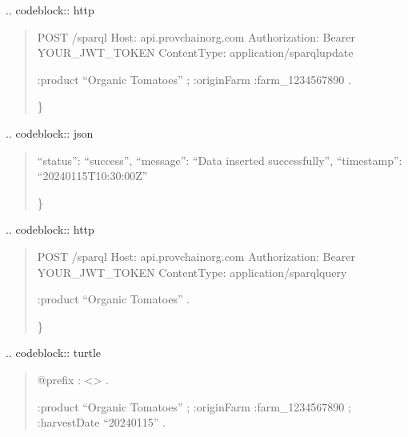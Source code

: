 \documentclass[letterpaper,10pt,english]{sphinxmanual}
\begin{document}
\sphinxAtStartPar
{}
.. code\sphinxhyphen{}block:: http
\begin{quote}

\sphinxAtStartPar
POST /sparql
Host: api.provchain\sphinxhyphen{}org.com
Authorization: Bearer YOUR\_JWT\_TOKEN
Content\sphinxhyphen{}Type: application/sparql\sphinxhyphen{}update
\begin{description}
\begin{description}
\sphinxAtStartPar
:product “Organic Tomatoes” ;
:originFarm :farm\_1234567890 .

\end{description}

\end{description}

\sphinxAtStartPar
\}
\end{quote}

\sphinxAtStartPar
{}
.. code\sphinxhyphen{}block:: json
\begin{quote}
\begin{description}
\sphinxlineitem{\{}
\sphinxAtStartPar
“status”: “success”,
“message”: “Data inserted successfully”,
“timestamp”: “2024\sphinxhyphen{}01\sphinxhyphen{}15T10:30:00Z”

\end{description}

\sphinxAtStartPar
\}
\end{quote}

\sphinxAtStartPar
{}
.. code\sphinxhyphen{}block:: http
\begin{quote}

\sphinxAtStartPar
POST /sparql
Host: api.provchain\sphinxhyphen{}org.com
Authorization: Bearer YOUR\_JWT\_TOKEN
Content\sphinxhyphen{}Type: application/sparql\sphinxhyphen{}query
\begin{description}
\begin{description}
\sphinxAtStartPar
:product “Organic Tomatoes” .

\end{description}

\end{description}

\sphinxAtStartPar
\}
\end{quote}

\sphinxAtStartPar
{}
.. code\sphinxhyphen{}block:: turtle
\begin{quote}

\sphinxAtStartPar
@prefix : \textless{}\textgreater{} .
\begin{description}
\sphinxAtStartPar
:product “Organic Tomatoes” ;
:originFarm :farm\_1234567890 ;
:harvestDate “2024\sphinxhyphen{}01\sphinxhyphen{}15” .

\end{description}
\end{quote}
\end{document}

